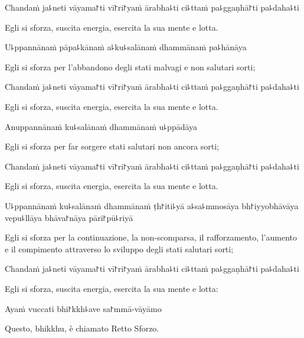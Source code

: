 Chandaṁ ja꜕neti vāyama꜓ti vī꜓ri꜓yaṁ ārabha꜕ti ci꜕ttaṁ pa꜕ggaṇhā꜓ti pa꜕daha꜕ti

\begin{english}
  Egli si sforza, suscita energia, esercita la sua mente e lotta.
\end{english}

U꜕ppannānaṁ pāpa꜕kānaṁ a꜕ku꜕salānaṁ dhammānaṁ pa꜕hānāya

\begin{english}
  Egli si sforza per l'abbandono degli stati malvagi e non salutari sorti;
\end{english}

Chandaṁ ja꜕neti vāyama꜓ti vī꜓ri꜓yaṁ ārabha꜕ti ci꜕ttaṁ pa꜕ggaṇhā꜓ti pa꜕daha꜕ti

\begin{english}
  Egli si sforza, suscita energia, esercita la sua mente e lotta.
\end{english}

Anuppannānaṁ ku꜕salānaṁ dhammānaṁ u꜕ppādāya

\begin{english}
  Egli si sforza per far sorgere stati salutari non ancora sorti;
\end{english}

Chandaṁ ja꜕neti vāyama꜓ti vī꜓ri꜓yaṁ ārabha꜕ti ci꜕ttaṁ pa꜕ggaṇhā꜓ti pa꜕daha꜕ti

\begin{english}
  Egli si sforza, suscita energia, esercita la sua mente e lotta.
\end{english}

\ifaivedition
\clearpage
\fi

U꜕ppannānaṁ ku꜕salānaṁ dhammānaṁ ṭh꜓iti꜕yā a꜕sa꜕mmosāya bh꜓iyyobhāvāya vepu꜕llāya bhāva꜓nāya pāri꜓pū꜕riyā

\begin{english}
  Egli si sforza per la continuazione, la non-scomparsa, il rafforzamento, l'aumento e il compimento attraverso lo sviluppo degli stati salutari sorti;
\end{english}

Chandaṁ ja꜕neti vāyama꜓ti vī꜓ri꜓yaṁ ārabha꜕ti ci꜕ttaṁ pa꜕ggaṇhā꜓ti pa꜕daha꜕ti

\begin{english}
  Egli si sforza, suscita energia, esercita la sua mente e lotta:
\end{english}

Ayaṁ vuccati bhi꜓kkh꜕ave sa꜓mmā-vāyāmo

\begin{english}
  Questo, bhikkhu, è chiamato Retto Sforzo.
\end{english}

